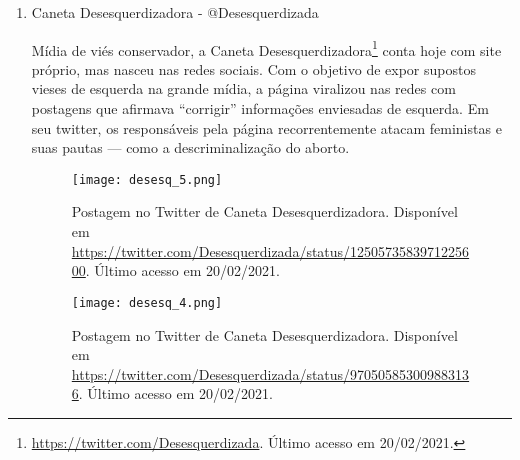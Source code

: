 \documentclass[
	12pt,				%
	openright,			%
	twoside,			%
	a4paper,			%
	english,			%
	brazil				%
	]{abntex2}
\begin{document}
\begin{anexosenv}
\begin{enumerate}
  Autodeclarado o maior jornal conservador do Brasil, o Brasil Sem Medo\footnote{\url{https://twitter.com/JornalBSM}. Último acesso em 20/02/2021.}, lançado no final de 2019, é uma mídia \textit{online} com textos e \textit{podcasts} associados que publica principalmente artigos de opinião sob um viés conservador. Em alguns de seus artigos, seus colaboradores criticam a ``ideologia de gênero'' e o feminismo (enquanto ``pauta extremista''\footnote{Exemplo em \url{https://brasilsemmedo.com/psol-a-repeticao-da-tragedia/}. Último acesso em 21/02/2021.}).
 
 \begin{figure}[!htbp]
    \centering
    \texttt{[image: brasils\_1.png]}
    \caption{Postagem no Twitter de Brasil sem medo. Disponível em \url{https://twitter.com/JornalBSM/status/1230922274318028801}. Último acesso em 20/02/2021.}
 \end{figure}
 
 \newpage
 
  \item Caneta Desesquerdizadora - @Desesquerdizada
  
  Mídia de viés conservador, a Caneta Desesquerdizadora\footnote{\url{https://twitter.com/Desesquerdizada}. Último acesso em 20/02/2021.} conta hoje com site próprio, mas nasceu nas redes sociais. Com o objetivo de expor supostos vieses de esquerda na grande mídia, a página viralizou nas redes com postagens que afirmava ``corrigir'' informações enviesadas de esquerda. Em seu twitter, os responsáveis pela página recorrentemente atacam feministas e suas pautas --- como a descriminalização do aborto.
 
 \begin{figure}[!htbp]
    \centering
    \texttt{[image: desesq\_5.png]}
    \caption{Postagem no Twitter de Caneta Desesquerdizadora. Disponível em \url{https://twitter.com/Desesquerdizada/status/1250573583971225600}. Último acesso em 20/02/2021.}
 \end{figure}
 
 \begin{figure}[!htbp]
    \centering
    \texttt{[image: desesq\_4.png]}
    \caption{Postagem no Twitter de Caneta Desesquerdizadora. Disponível em \url{https://twitter.com/Desesquerdizada/status/970505853009883136}. Último acesso em 20/02/2021.}
 \end{figure}
 
 

\end{enumerate}
\end{anexosenv}
\end{document}
